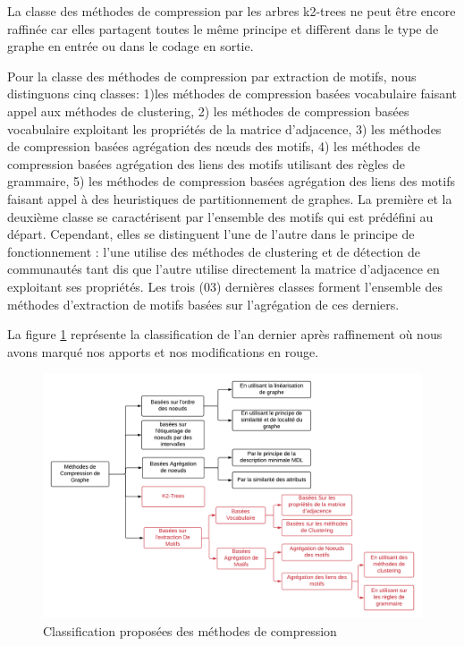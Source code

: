 La classe des méthodes de compression par les arbres k2-trees ne peut être encore raffinée car elles partagent toutes le même principe et diffèrent dans le type de graphe en entrée ou dans le codage en sortie.

Pour la classe des méthodes de compression par extraction de motifs, nous distinguons cinq classes: 1)les méthodes de compression basées vocabulaire faisant appel aux méthodes de clustering, 2) les méthodes de compression basées vocabulaire exploitant les propriétés de la matrice d'adjacence, 3) les méthodes de compression basées agrégation des nœuds des motifs, 4) les méthodes de compression basées agrégation des liens des motifs utilisant des règles de grammaire, 5) les méthodes de compression basées agrégation des liens des motifs faisant appel à des heuristiques de partitionnement de graphes. La première et la deuxième classe se caractérisent par l'ensemble des motifs qui est prédéfini au départ. Cependant, elles se distinguent l'une de l'autre dans le principe de fonctionnement : l'une utilise des méthodes de clustering et de détection de communautés tant dis que l'autre utilise directement la matrice d'adjacence en exploitant ses propriétés. Les trois (03) dernières classes forment l'ensemble des méthodes d'extraction de motifs basées sur l'agrégation de ces derniers. 



 La figure \ref{classif} représente la classification de l'an dernier après raffinement où nous avons marqué nos apports et nos modifications en rouge.

 \begin{figure}[H]
		\includegraphics[scale=0.55]{./ressources/image/classif.png}
		\caption{Classification proposées des méthodes de compression}
		\label{classif}
	\end{figure}





